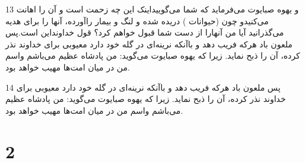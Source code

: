 \par 13 و یهوه صبایوت می‌فرماید که شما می‌گوییداینک این چه زحمت است و آن را اهانت می‌کنیدو چون (حیوانات ) دریده شده و لنگ و بیمار راآورده، آنها را برای هدیه می‌گذرانید آیا من آنهارا از دست شما قبول خواهم کرد؟ قول خداونداین است.پس ملعون باد هر‌که فریب دهد و باآنکه نرینه‌ای در گله خود دارد معیوبی برای خداوند نذر کرده، آن را ذبح نماید. زیرا که یهوه صبایوت می‌گوید: من پادشاه عظیم می‌باشم واسم من در میان امت‌ها مهیب خواهد بود.
\par 14 پس ملعون باد هر‌که فریب دهد و باآنکه نرینه‌ای در گله خود دارد معیوبی برای خداوند نذر کرده، آن را ذبح نماید. زیرا که یهوه صبایوت می‌گوید: من پادشاه عظیم می‌باشم واسم من در میان امت‌ها مهیب خواهد بود.

\chapter{2}

